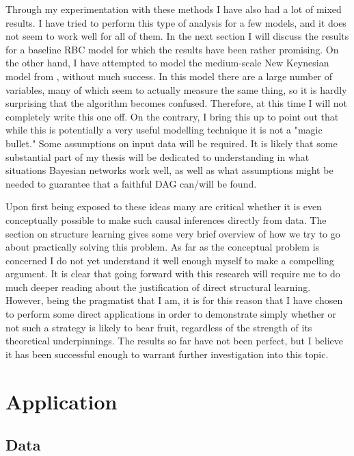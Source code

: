 \documentclass{article}
\begin{document}
Through my experimentation with these methods I have also had a lot of mixed results. I have tried to perform this type of analysis for a few models, and it does not seem to work well for all of them. In the next section I will discuss the results for a baseline RBC model for which the results have been rather promising. On the other hand, I have attempted to model the medium-scale New Keynesian model from \parencite{smets2007shocks}, without much success. In this model there are a large number of variables, many of which seem to actually measure the same thing, so it is hardly surprising that the algorithm becomes confused. Therefore, at this time I will not completely write this one off. On the contrary, I bring this up to point out that while this is potentially a very useful modelling technique it is not a "magic bullet." Some assumptions on input data will be required. It is likely that some substantial part of my thesis will be dedicated to understanding in what situations Bayesian networks work well, as well as what assumptions might be needed to guarantee that a faithful DAG can/will be found.

Upon first being exposed to these ideas many are critical whether it is even conceptually possible to make such causal inferences directly from data. The section on structure learning gives some very brief overview of how we try to go about practically solving this problem. As far as the conceptual problem is concerned I do not yet understand it well enough myself to make a compelling argument. It is clear that going forward with this research will require me to do much deeper reading about the justification of direct structural learning. However, being the pragmatist that I am, it is for this reason that I have chosen to perform some direct applications in order to demonstrate simply whether or not such a strategy is likely to bear fruit, regardless of the strength of its theoretical underpinnings. The results so far have not been perfect, but I believe it has been successful enough to warrant further investigation into this topic.

\section{Application}

\subsection{Data}
\end{document}
